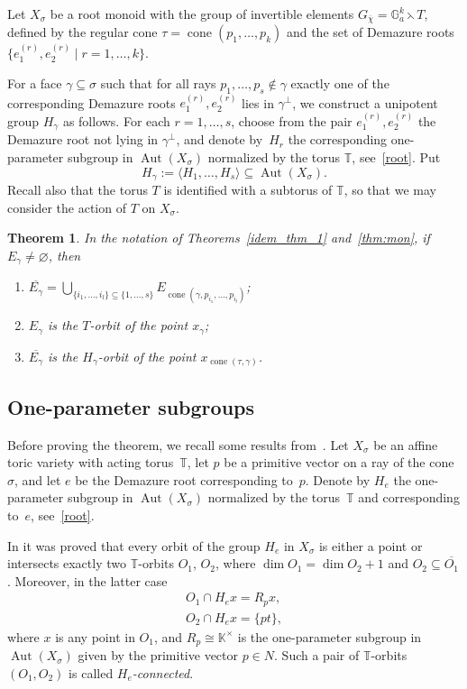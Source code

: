 \documentclass[a4paper, 11pt]{amsart}
\theoremstyle{plain}
\newtheorem{theorem}{Theorem}[section]
\theoremstyle{remark}
\theoremstyle{definition}
\newcommand{\KK}{\mathbb{K}}
\newcommand{\G}{\mathbb{G}}
\newcommand{\GG}{G_{\overline{\chi}}}
\newcommand{\TT}{\mathbb{T}}
\newcommand{\ol}[1]{\overline{#1}}
\DeclareMathOperator{\Aut}{Aut}
\DeclareMathOperator{\cone}{cone}
\begin{document}
Let $X_\sigma$ be a root monoid with the group of invertible elements $\GG = \G_a^k \leftthreetimes T$, defined by the regular cone $\tau = \cone(p_1, \ldots, p_{k})$ and the set of Demazure roots $\{e_1^{(r)}, e_2^{(r)} \mid r = 1,\ldots, k\}$. 

For a face $\gamma \subseteq \sigma$ such that for all rays $p_1, \ldots, p_s \notin \gamma$ exactly one of the corresponding Demazure roots $e_1^{(r)}, e_2^{(r)}$ lies in $\gamma^\perp$, we construct a unipotent group $H_\gamma$ as follows. 
For each $r = 1, \ldots, s$, choose from the pair $e_1^{(r)}, e_2^{(r)}$ the Demazure root not lying in $\gamma^\perp$, and denote by~$H_r$ the corresponding one-parameter subgroup in $\Aut(X_\sigma)$ normalized by the torus $\TT$, see~\ref{root}. Put \[H_\gamma:= \langle H_1, \ldots, H_s \rangle \subseteq \Aut(X_\sigma).\] Recall also that the torus $T$ is identified with a subtorus of $\TT$, so that we may consider the action of $T$ on $X_\sigma$. 

\begin{theorem}\label{idem_thm_2}
	In the notation of Theorems~\ref{idem_thm_1} and~\ref{thm:mon}, if $E_\gamma \neq \varnothing$, then
	\begin{enumerate}
		\item $\ol{E_\gamma} = \bigcup_{\{i_1, \ldots, i_l\} \subseteq \{1, \ldots, s\}} E_{\cone(\gamma, p_{i_1}, \ldots, p_{i_l})}$;
		\item $E_\gamma$ is the $T$-orbit of the point $x_\gamma$;
		\item $\ol{E_\gamma}$ is the $H_\gamma$-orbit of the point $x_{\cone(\tau, \gamma)}$.
	\end{enumerate}
\end{theorem}

\subsection{One-parameter subgroups}
Before proving the theorem, we recall some results from~\cite{AKZ2012}. Let $X_\sigma$ be an affine toric variety with acting torus~$\TT$, let $p$ be a primitive vector on a ray of the cone~$\sigma$, and let $e$ be the Demazure root corresponding to~$p$. Denote by $H_e$ the one-parameter subgroup in $\Aut(X_\sigma)$ normalized by the torus~$\TT$ and corresponding to~$e$, see~\ref{root}. 

In \cite[Proposition~2.1]{AKZ2012} it was proved that every orbit of the group $H_e$ in $X_\sigma$ is either a point or intersects exactly two $\TT$-orbits $O_1$, $O_2$, where ${\dim O_1 = \dim O_2 + 1}$ and $O_2 \subseteq \overline{O_1}$. Moreover, in the latter case
\begin{equation}
	\label{Heorbit_eq}
	\begin{aligned}
		O_1 \cap H_ex = R_px,\\
		O_2 \cap H_ex = \{pt\},
	\end{aligned}
\end{equation}
where $x$ is any point in $O_1$, and $R_p \cong \KK^\times$ is the one-parameter subgroup in $\Aut(X_\sigma)$ given by the primitive vector $p \in N$. Such a pair of $\TT$-orbits $(O_1, O_2)$ is called \emph{$H_e$-connected}. 
\end{document}
